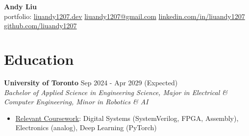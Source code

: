 \documentclass[10pt,letterpaper]{article}
\begin{document}
\begin{center}
\huge{\textbf{Andy Liu}} \\
\vspace*{0.5em}
\small{{portfolio: \href{https://liuandy1207.dev}{liuandy1207.dev}}
        \hspace{0.5em} \textbar \hspace{0.5em}
        \href{mailto: liuandy1207@gmail.com}{liuandy1207@gmail.com}
        \hspace{0.5em} \textbar \hspace{0.5em}
        \href{https://www.linkedin.com/in/liuandy1207/}{linkedin.com/in/liuandy1207}}
        \hspace{0.5em} \textbar \hspace{0.5em}
        \href{https://github.com/liuandy1207}{github.com/liuandy1207}
\end{center} \vspace{-0.7em}







\section{Education}

\textbf{University of Toronto} \hfill
Sep 2024 - Apr 2029 (Expected) \\
\textit{Bachelor of Applied Science in Engineering Science, Major in Electrical \& Computer Engineering, Minor in Robotics \& AI} \hfill 
\begin{itemize}
    \item \underline{Relevant Coursework}: Digital Systems (SystemVerilog, FPGA, Assembly), Electronics (analog), Deep Learning (PyTorch)
\end{itemize} \vspace{0.5em}
\end{document}

